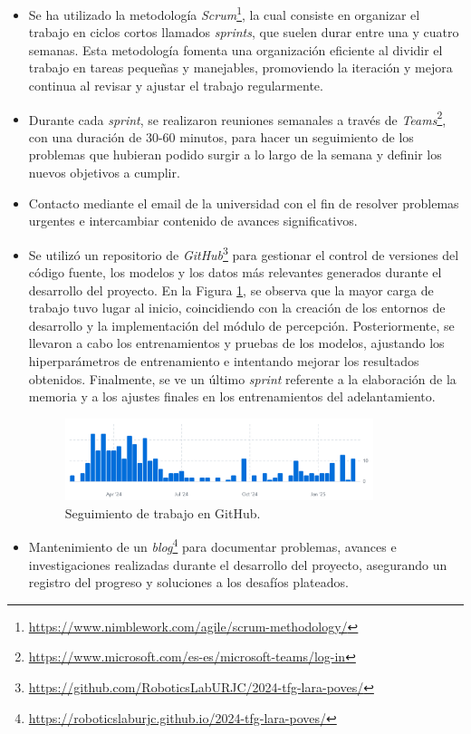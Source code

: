 \begin{itemize}
\item Se ha utilizado la metodología \textit{Scrum}\footnote{\url{https://www.nimblework.com/agile/scrum-methodology/}}, la cual consiste en organizar el trabajo en ciclos cortos llamados \textit{sprints}, que suelen durar entre una y cuatro semanas. Esta metodología fomenta una organización eficiente al dividir el trabajo en tareas pequeñas y manejables, promoviendo la iteración y mejora continua al revisar y ajustar el trabajo regularmente.
\item Durante cada \textit{sprint}, se realizaron reuniones semanales a través de \textit{Teams}\footnote{\url{https://www.microsoft.com/es-es/microsoft-teams/log-in}}, con una duración de 30-60 minutos, para hacer un seguimiento de los problemas que hubieran podido surgir a lo largo de la semana y definir los nuevos objetivos a cumplir.
\item Contacto mediante el email de la universidad con el fin de resolver problemas urgentes e intercambiar contenido de avances significativos.
\item Se utilizó un repositorio de \textit{GitHub}\footnote{\url{https://github.com/RoboticsLabURJC/2024-tfg-lara-poves/}} para gestionar el control de versiones del código fuente, los modelos y los datos más relevantes generados durante el desarrollo del proyecto. En la Figura \ref{fig:github}, se observa que la mayor carga de trabajo tuvo lugar al inicio, coincidiendo con la creación de los entornos de desarrollo y la implementación del módulo de percepción. Posteriormente, se llevaron a cabo los entrenamientos y pruebas de los modelos, ajustando los hiperparámetros de entrenamiento e intentando mejorar los resultados obtenidos. Finalmente, se ve un último \textit{sprint} referente a la elaboración de la memoria y a los ajustes finales en los entrenamientos del adelantamiento.

\begin{figure}[ht]
\centering
\includegraphics[width=9cm]{figs/objetivos/github.png}
\caption{Seguimiento de trabajo en GitHub.}
\label{fig:github}
\end{figure}

\item Mantenimiento de un \textit{blog}\footnote{\url{https://roboticslaburjc.github.io/2024-tfg-lara-poves/}} para documentar problemas, avances e investigaciones realizadas durante el desarrollo del proyecto, asegurando un registro del progreso y soluciones a los desafíos plateados.

\end{itemize}

